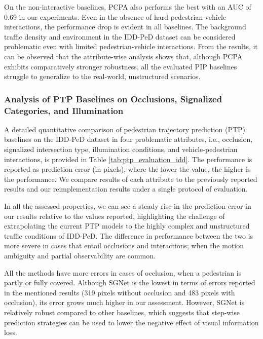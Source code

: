 \documentclass[12pt, a4paper]{article}
\begin{document}
On the non-interactive baselines, PCPA also performs the best with an AUC of 0.69 in our experiments. Even in the absence of hard pedestrian-vehicle interactions, the performance drop is evident in all baselines. The background traffic density and environment in the IDD-PeD dataset can be considered problematic even with limited pedestrian-vehicle interactions. From the results, it can be observed that the attribute-wise analysis shows that, although PCPA exhibits comparatively stronger robustness, all the evaluated PIP baselines struggle to generalize to the real-world, unstructured scenarios.

\subsubsection{Analysis of PTP Baselines on Occlusions, Signalized Categories, and Illumination}
A detailed quantitative comparison of pedestrian trajectory prediction (PTP) baselines on the IDD-PeD dataset in four problematic attributes, i.e., occlusion, signalized intersection type, illumination conditions, and vehicle-pedestrian interactions, is provided in Table \ref{tab:ptp_evaluation_idd}. The performance is reported as prediction error (in pixels), where the lower the value, the higher is the performance. We compare results of each attribute to the previously reported results and our reimplementation results under a single protocol of evaluation.

In all the assessed properties, we can see a steady rise in the prediction error in our results relative to the values reported, highlighting the challenge of extrapolating the current PTP models to the highly complex and unstructured traffic conditions of IDD-PeD. The difference in performance between the two is more severe in cases that entail occlusions and interactions; when the motion ambiguity and partial observability are common.

All the methods have more errors in cases of occlusion, when a pedestrian is partly or fully covered. Although SGNet \cite{wang2022stepwise} is the lowest in terms of errors reported in the mentioned results (319 pixels without occlusion and 483 pixels with occlusion), its error grows much higher in our assessment. However, SGNet is relatively robust compared to other baselines, which suggests that step-wise prediction strategies can be used to lower the negative effect of visual information loss.\\
\end{document}

